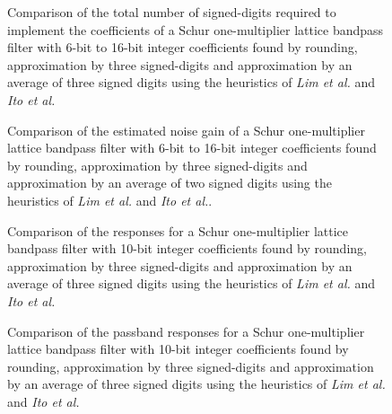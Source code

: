 \documentclass[a4paper,twoside,10pt,english]{report}
\begin{document}
\begin{figure}[!htbp]
\begin{center}
\scalebox{0.7}{}
\caption{Comparison of the total number of signed-digits required to implement
the coefficients of a Schur one-multiplier lattice
bandpass filter with 6-bit to 16-bit integer coefficients found by rounding,
approximation by three signed-digits and approximation by an average of three 
signed digits using the heuristics of \emph{Lim et al.} and \emph{Ito et al.}}
\label{fig:schurOneMlattice-bandpass-3-allocsd-used}
\end{center}
\end{figure}
\begin{figure}[!htbp]
\begin{center}
\scalebox{0.7}{}
\caption{Comparison of the estimated noise gain of a Schur one-multiplier lattice
bandpass filter with 6-bit to 16-bit integer coefficients found by rounding,
approximation by three signed-digits and approximation by an average of two 
signed digits using the heuristics of \emph{Lim et al.} and \emph{Ito et al.}.}
\label{fig:schurOneMlattice-bandpass-3-allocsd-noise-gain}
\end{center}
\end{figure}
\begin{figure}[!htbp]
\begin{center}
\scalebox{0.7}{}
\caption{Comparison of the responses for a Schur one-multiplier lattice
bandpass filter with 10-bit integer coefficients found by rounding,
approximation by three signed-digits and approximation by an average of three
signed digits using the heuristics of \emph{Lim et al.} and \emph{Ito et al.}}
\label{fig:schurOneMlattice-bandpass-allocsd-3-10-response}
\end{center}
\end{figure}
\begin{figure}[!htbp]
\begin{center}
\scalebox{0.7}{}
\caption{Comparison of the passband responses for a Schur one-multiplier lattice
bandpass filter with 10-bit integer coefficients found by rounding, 
approximation by three signed-digits and approximation by an average of three
signed digits using the heuristics of \emph{Lim et al.} and \emph{Ito et al.}}
\label{fig:schurOneMlattice-bandpass-allocsd-3-10-passband-response}
\end{center}
\end{figure}
\clearpage
\end{document}
